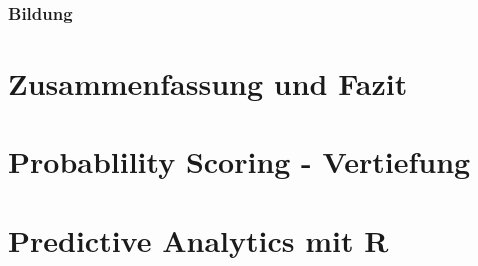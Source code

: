\documentclass[12pt,a4paper,listof=totoc,oneside]{scrreprt}
\begin{document}
\subsection{Bildung}


\chapter{Zusammenfassung und Fazit}

\appendix
\chapter{Probablility Scoring - Vertiefung}

%   

\chapter{Predictive Analytics mit R}



\listoffigures
\listoftables
\printglossary[title=Glossar]
\printglossary[type=\acronymtype, title=Akronyme]

{}

\end{document}
